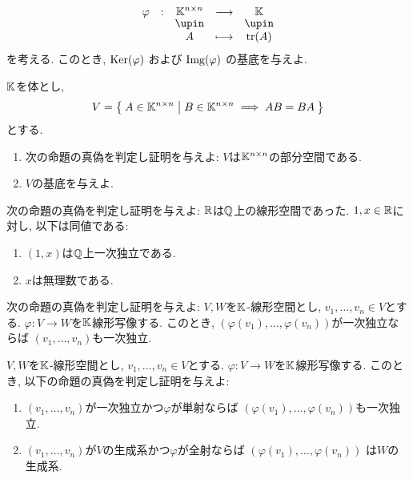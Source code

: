 \begin{quiz}
  \begin{align*}
    \shazo{\varphi}{\KK^{n\times n}}{\KK}
    {A}{\tr(A)}
  \end{align*}
  を考える.
  このとき,
  $\operatorname{Ker}(\varphi)$
  および
  $\operatorname{Img}(\varphi)$
  の基底を与えよ.
\end{quiz}

\begin{quiz}
  $\mathbb{K}$を体とし,
  \begin{align*}
    V=
    \Set{A\in\mathbb{K}^{n\times n} | B\in \mathbb{K}^{n\times n} \implies AB=BA}
  \end{align*}
  とする.
  \begin{enumerate}
  \item
    次の命題の真偽を判定し証明を与えよ:
    $V$は$\mathbb{K}^{n\times n}$の部分空間である.
  \item
    $V$の基底を与えよ.
  \end{enumerate}
\end{quiz}

\begin{quiz}
  次の命題の真偽を判定し証明を与えよ:
  $\mathbb{R}$は$\mathbb{Q}$上の線形空間であった.
  $1,x\in\mathbb{R}$に対し, 以下は同値である:
  \begin{enumerate}
  \item $(1,x)$は$\mathbb{Q}$上一次独立である.
  \item $x$は無理数である.
  \end{enumerate}
\end{quiz}


\begin{quiz}
  次の命題の真偽を判定し証明を与えよ:
  $V,W$を$\mathbb{K}$-線形空間とし,
  $v_1,\ldots,v_n\in V$とする.
  $\varphi\colon V\to W$を$\mathbb{K}$線形写像する.
  このとき,
  $(\varphi(v_1),\ldots,\varphi(v_n))$が一次独立ならば
  $(v_1,\ldots,v_n)$も一次独立.
\end{quiz}

\begin{quiz}
  $V,W$を$\mathbb{K}$-線形空間とし,
  $v_1,\ldots,v_n\in V$とする.
  $\varphi\colon V\to W$を$\mathbb{K}$線形写像する.
  このとき,
  以下の命題の真偽を判定し証明を与えよ:
  \begin{enumerate}
  \item    
    $(v_1,\ldots,v_n)$が一次独立かつ$\varphi$が単射ならば
    $(\varphi(v_1),\ldots,\varphi(v_n))$も一次独立.
  \item
    $(v_1,\ldots,v_n)$が$V$の生成系かつ$\varphi$が全射ならば
    $(\varphi(v_1),\ldots,\varphi(v_n))$
    は$W$の生成系.
  \end{enumerate}
\end{quiz}

